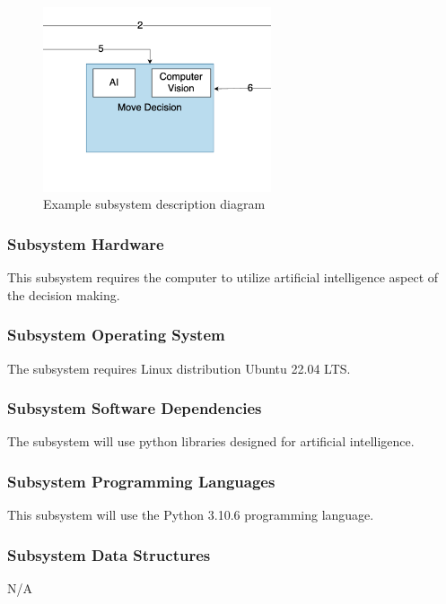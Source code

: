\begin{figure}[h!]
	\centering
 	\includegraphics[width=0.60\textwidth]{images/move_decision.png}
 \caption{Example subsystem description diagram}
\end{figure}

\subsubsection{Subsystem Hardware}
This subsystem requires the computer to utilize artificial intelligence aspect of the decision making.

\subsubsection{Subsystem Operating System}
The subsystem requires Linux distribution Ubuntu 22.04 LTS.

\subsubsection{Subsystem Software Dependencies}
The subsystem will use python libraries designed for artificial intelligence.

\subsubsection{Subsystem Programming Languages}
This subsystem will use the Python 3.10.6 programming language.

\subsubsection{Subsystem Data Structures}
N/A

